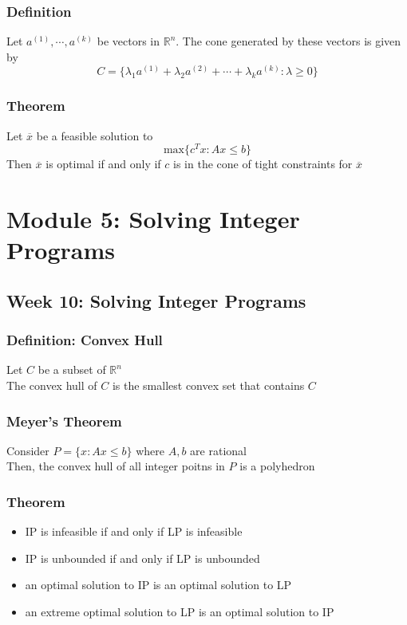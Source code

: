 \documentclass[11pt]{article}
\newcommand{\R}{{\mathbb{R}}}
\begin{document}
\subsubsection{Definition}
Let $a^{(1)}, \cdots, a^{(k)}$ be vectors in $\R^n$. The cone generated by these vectors is given by 
\[C=\{\lambda_1a^{(1)} + \lambda_2a^{(2)} + \cdots + \lambda_ka^{(k)}: \lambda\geq 0\}\]
\subsubsection{Theorem}
Let $\overline{x}$ be a feasible solution to 
\[\text{max}\{c^Tx: Ax\leq b\}\]
Then $\overline{x}$ is optimal if and only if $c$ is in the cone of tight constraints for $\overline{x}$

\section{Module 5: Solving Integer Programs}
\subsection{Week 10: Solving Integer Programs}
\subsubsection{Definition: Convex Hull}
Let $C$ be a subset of $\R^n$ \\
The convex hull of $C$ is the smallest convex set that contains $C$
\subsubsection{Meyer's Theorem}
Consider $P=\{x:Ax\leq b\}$ where $A,b$ are rational \\
Then, the convex hull of all integer poitns in $P$ is a polyhedron 
\subsubsection{Theorem}
\begin{itemize}
  \item IP is infeasible if and only if LP is infeasible 
  \item IP is unbounded if and only if LP is unbounded 
  \item an optimal solution to IP is an optimal solution to LP 
  \item an extreme optimal solution to LP is an optimal solution to IP
\end{itemize}
\end{document}
